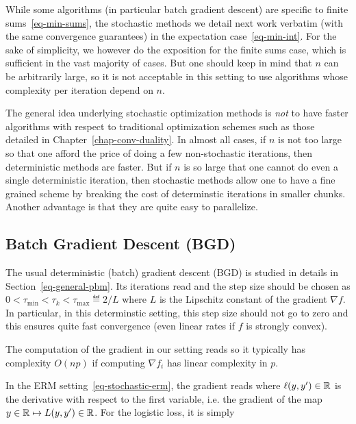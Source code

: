 While some algorithms (in particular batch gradient descent) are specific to finite sums~\eqref{eq-min-sums}, the stochastic methods we detail next work verbatim (with the same convergence guarantees) in the expectation case~\eqref{eq-min-int}. For the sake of simplicity, we however do the exposition for the finite sums case, which is sufficient in the vast majority of cases. But one should keep in mind that $n$ can be arbitrarily large, so it is not acceptable in this setting to use algorithms whose complexity per iteration depend on $n$.

The general idea underlying stochastic optimization methods is \textit{not} to have faster algorithms with respect to traditional optimization schemes such as those detailed in Chapter~\ref{chap-conv-duality}. In almost all cases, if $n$ is not too large so that one afford the price of doing a few non-stochastic iterations, then deterministic methods are faster. But if $n$ is so large that one cannot do even a single deterministic iteration, then stochastic methods allow one to have a fine grained scheme by breaking the cost of determinstic iterations in smaller chunks. Another advantage is that they are quite easy to parallelize. 


\subsection{Batch Gradient Descent (BGD)}

The usual deterministic (batch) gradient descent (BGD) is studied in details in Section~\ref{eq-general-pbm}. Its iterations read
and the step size should be chosen as $0 < \tau_{\min} < \tau_k < \tau_{\max} \eqdef 2/L$ where $L$ is the Lipschitz constant of the gradient $\nabla f$. In particular, in this determinstic setting, this step size should not go to zero and this ensures quite fast convergence (even linear rates if $f$ is strongly convex).

The computation of the gradient in our setting reads
so it typically has complexity $O(np)$ if computing $\nabla f_i$ has linear complexity in $p$.

In the ERM setting~\eqref{eq-stochastic-erm}, the gradient reads 
where $\ell( y,y' ) \in \mathbb{R}$ is the derivative with respect to the first variable, i.e. the gradient of the map $y \in \mathbb{R} \mapsto L(y,y') \in \mathbb{R}$.
%
For the logistic loss, it is simply 


